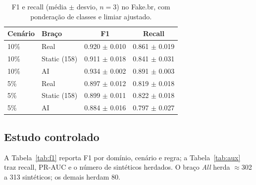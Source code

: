 \documentclass[conference]{IEEEtran}
\begin{document}
\begin{table}[t]
\caption{F1 e recall (m\'edia $\pm$ desvio, $n{=}3$) no Fake.br, com pondera\c{c}\~ao de classes e limiar ajustado.}\label{tab:fakebr}
\centering
\footnotesize
\setlength{\tabcolsep}{4pt}
\begin{tabular}{@{}llcc@{}}
\toprule
Cen\'ario & Bra\c{c}o & F1 & Recall \\
\midrule
10\% & Real & 0.920 $\pm$ 0.010 & 0.861 $\pm$ 0.019 \\
10\% & Static (158) & 0.911 $\pm$ 0.018 & 0.841 $\pm$ 0.031 \\
10\% & AI & 0.934 $\pm$ 0.002 & 0.891 $\pm$ 0.003 \\
5\% & Real & 0.897 $\pm$ 0.012 & 0.819 $\pm$ 0.018 \\
5\% & Static (158) & 0.899 $\pm$ 0.011 & 0.822 $\pm$ 0.018 \\
5\% & AI & 0.884 $\pm$ 0.016 & 0.797 $\pm$ 0.027 \\
\bottomrule
\end{tabular}
\end{table}

\subsection{Estudo controlado}

A Tabela~\ref{tab:f1} reporta F1 por dom\'inio, cen\'ario e regra; a Tabela~\ref{tab:aux} traz recall, PR-AUC e o n\'umero de sint\'eticos herdados. O bra\c{c}o \emph{All} herda $\approx$302 a 313 sint\'eticos; os demais herdam 80.
\end{document}
